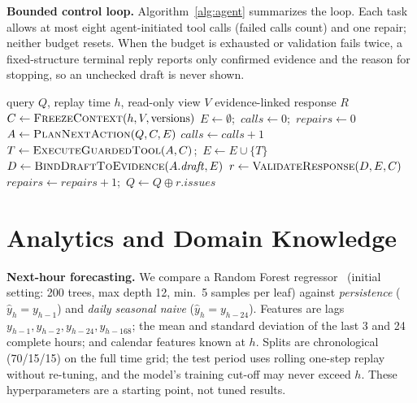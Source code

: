 \documentclass[conference]{IEEEtran}
\begin{document}
\textbf{Bounded control loop.} Algorithm~\ref{alg:agent} summarizes the
loop. Each task allows at most eight agent-initiated tool calls (failed
calls count) and one repair; neither budget resets. When the budget is
exhausted or validation fails twice, a fixed-structure terminal reply
reports only confirmed evidence and the reason for stopping, so an
unchecked draft is never shown.

\begin{algorithm}[t]
\caption{Energy Detective agent loop}
\label{alg:agent}
\footnotesize
\begin{algorithmic}[1]
\Require query $Q$, replay time $h$, read-only view $V$
\Ensure evidence-linked response $R$
\State $C \gets \Call{FreezeContext}{h, V, \text{versions}}$
\State $E \gets \emptyset$;\ $calls \gets 0$;\ $repairs \gets 0$
\Loop
  \State $A \gets \Call{PlanNextAction}{Q, C, E}$
     \State \Return {}
      \State \Return {} \EndIf
     \State $calls \gets calls+1$
     \State $T \gets \Call{ExecuteGuardedTool}{A, C}$;\ $E \gets E \cup \{T\}$
     \State $D \gets \Call{BindDraftToEvidence}{A.\mathit{draft}, E}$
     \State $r \gets \Call{ValidateResponse}{D, E, C}$
      \State \Return {} \EndIf
      \State \Return {} \EndIf
     \State $repairs \gets repairs+1$;\ $Q \gets Q \oplus r.\mathit{issues}$
  \Else
     \State \Return {}
  \EndIf
\EndLoop
\end{algorithmic}
\end{algorithm}

\section{Analytics and Domain Knowledge}
\label{sec:methods}

\textbf{Next-hour forecasting.} We compare a Random Forest
regressor~\cite{pedregosa2011sklearn} (initial setting: 200 trees,
max depth 12, min.\ 5 samples per leaf) against \emph{persistence}
($\hat y_h = y_{h-1}$) and \emph{daily seasonal naive}
($\hat y_h = y_{h-24}$). Features are lags $y_{h-1}, y_{h-2},
y_{h-24}, y_{h-168}$; the mean and standard deviation of the last 3 and
24 complete hours; and calendar features known at $h$. Splits are
chronological (70/15/15) on the full time grid; the test period uses
rolling one-step replay without re-tuning, and the model's training
cut-off may never exceed $h$. These hyperparameters are a starting
point, not tuned results.
\end{document}
